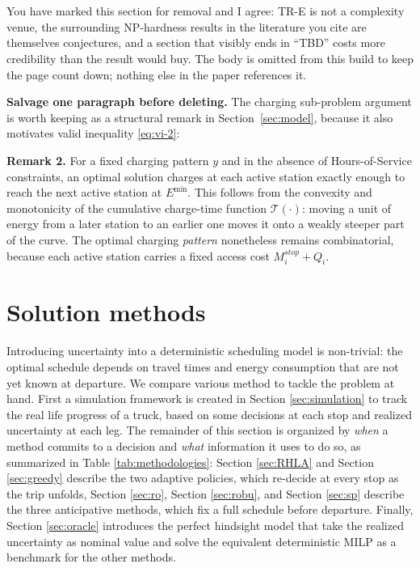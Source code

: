 \section{}
\label{sec:complexity}

\begin{atodo}
You have marked this section for removal and I agree: TR-E is not a complexity
venue, the surrounding NP-hardness results in the literature you cite are
themselves conjectures, and a section that visibly ends in ``TBD'' costs more
credibility than the result would buy. The body is omitted from this build to
keep the page count down; nothing else in the paper references it.

\medskip
\textbf{Salvage one paragraph before deleting.} The charging sub-problem argument
is worth keeping as a structural remark in Section~\ref{sec:model}, because it
also motivates valid inequality \eqref{eq:vi-2}:
\end{atodo}

\begin{anew}
\noindent\textbf{Remark 2.} For a fixed charging pattern $y$ and in the absence
of Hours-of-Service constraints, an optimal solution charges at each active
station exactly enough to reach the next active station at $E^{\min}$. This
follows from the convexity and monotonicity of the cumulative charge-time
function $\mathcal T(\cdot)$: moving a unit of energy from a later station to an
earlier one moves it onto a weakly steeper part of the curve. The optimal
charging \emph{pattern} nonetheless remains combinatorial, because each active
station carries a fixed access cost $M^{stop}_i + Q_i$.
\end{anew}

\section{Solution methods} \label{sec:method}
Introducing uncertainty into a deterministic scheduling model is non-trivial: the optimal schedule depends on travel times and energy consumption that are not yet known at departure. We compare various method to tackle the problem at hand. First a simulation framework is created in Section \ref{sec:simulation} to track the real life progress of a truck, based on some decisions at each stop and realized uncertainty at each leg.
The remainder of this section is organized by \textit{when} a method commits to a decision and \textit{what} information it uses to do so, as summarized in Table \ref{tab:methodologies}: Section \ref{sec:RHLA} and Section \ref{sec:greedy} describe the two adaptive policies, which re-decide at every stop as the trip unfolds, Section \ref{sec:ro}, {Section \ref{sec:robu},} and Section \ref{sec:sp} describe the {three} anticipative methods, which fix a full schedule before departure. Finally, Section \ref{sec:oracle} introduces the perfect hindsight model that take the realized uncertainty as nominal value and solve the equivalent deterministic MILP as a benchmark for the other methods.

